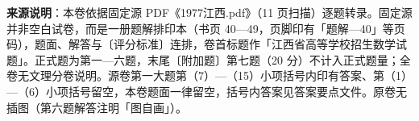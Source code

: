 


\begin{gktip}
\textbf{来源说明}：本卷依据固定源 PDF《1977江西.pdf》（11 页扫描）逐题转录。固定源并非空白试卷，而是一册题解排印本（书页 40—49，页脚印有「题解—40」等页码），题面、解答与〔评分标准〕连排，卷首标题作「江西省高等学校招生数学试题」。正式题为第一—六题，末尾〔附加题〕第七题（20 分）不计入正式题量；全卷无文理分卷说明。源卷第一大题第（7）—（15）小项括号内印有答案、第（1）—（6）小项括号留空，本卷题面一律留空，括号内答案见答案要点文件。原卷无插图（第六题解答注明「图自画」）。
\end{gktip}

\par\medskip

